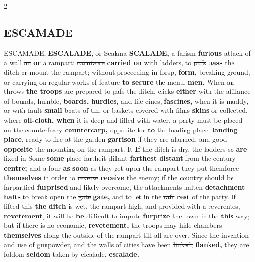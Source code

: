 \documentclass[10pt]{article}
\begin{document}
\begin{multicols}{2}
\subsection*{ESCAMADE}
\sout{ESCAMADE,} \textbf{ESCALADE,} or \sout{Sealana} \textbf{SCALADE,} a \sout{farism} \textbf{furious} attack of a wall \sout{on} \textbf{or} a rampart; \sout{carnivore} \textbf{carried on} with ladders, to \sout{pafs} \textbf{pass} the ditch or mount the rampart; without proceeding in \sout{forsp,} \textbf{form,} breaking ground, or carrying on regular works \sout{of feature} \textbf{to secure} the \sout{menu.} \textbf{men.} When \sout{an throws} \textbf{the troops} are prepared to pafs the ditch, \sout{clicks} \textbf{either} with the affilance of \sout{bounds, humble,} \textbf{boards, hurdles,} and \sout{life cines,} \textbf{fascines,} when it is muddy, or with \sout{fault} \textbf{small} boats of tin, or baskets covered with \sout{films} \textbf{skins} or \sout{collected, where} \textbf{oil-cloth, when} it is deep and filled with water, a party must be placed on the \sout{counterfeary} \textbf{countercarp,} opposite \sout{for} \textbf{to} the \sout{loading-place,} \textbf{landing-place,} ready to fire at the \sout{garden} \textbf{garrison} if they are alarmed, and \sout{good} \textbf{opposite} the mounting on the rampart. \sout{It} \textbf{If} the ditch is dry, the ladders \sout{so} \textbf{are} fixed in \sout{Some} \textbf{some} place \sout{fartheit diflant} \textbf{farthest distant} from the \sout{century} \textbf{centre;} and \sout{a four} \textbf{as soon} as they get upon the rampart they put \sout{themforce} \textbf{themselves} in order to \sout{reverse} \textbf{receive} the enemy; if the country should be \sout{farparified} \textbf{furprised} and likely overcome, the \sout{attachments halten} \textbf{detachment halts} to break open the \sout{gate} \textbf{gate,} and to let in the \sout{raft} \textbf{rest} of the party. If \sout{lifted this} \textbf{the ditch} is wet, the rampart high, and provided with a \sout{reverentes,} \textbf{revetement,} it will \sout{he} \textbf{be} difficult to \sout{impute} \textbf{furprize} the town in \sout{the} \textbf{this} way; but if there is no \sout{economic,} \textbf{revetement,} the troops may hide \sout{chambers} \textbf{themselves} along the outside of the rampart till all are over. Since the invention and use of gunpowder, and the walls of cities have been \sout{linked,} \textbf{flanked,} they are \sout{foldom} \textbf{seldom} taken by \sout{efcalade.} \textbf{escalade.}


\end{multicols}
\end{document}
